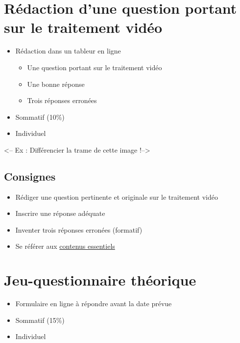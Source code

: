 \documentclass[
  french,
]{book}
\providecommand{\tightlist}{%
  \setlength{\itemsep}{0pt}\setlength{\parskip}{0pt}}
\begin{document}
\hypertarget{sommatif_2}{%
\section{Rédaction d'une question portant sur le traitement vidéo}\label{sommatif_2}}

\begin{itemize}
\tightlist
\item
  Rédaction dans un tableur en ligne

  \begin{itemize}
  \tightlist
  \item
    Une question portant sur le traitement vidéo
  \item
    Une bonne réponse
  \item
    Trois réponses erronées\\
  \end{itemize}
\item
  Sommatif (10\%)
\item
  Individuel
\end{itemize}

\textless-- Ex : Différencier la trame de cette image !--\textgreater{}

\hypertarget{consignes-1}{%
\subsection{Consignes}\label{consignes-1}}

\begin{itemize}
\tightlist
\item
  Rédiger une question pertinente et originale sur le traitement vidéo
\item
  Inscrire une réponse adéquate
\item
  Inventer trois réponses erronées (formatif)
\item
  Se référer aux \href{}{contenus essentiels}
\end{itemize}

\hypertarget{sommatif_3}{%
\section{Jeu-questionnaire théorique}\label{sommatif_3}}

\begin{itemize}
\tightlist
\item
  Formulaire en ligne à répondre avant la date prévue
\item
  Sommatif (15\%)
\item
  Individuel
\end{itemize}
\end{document}
